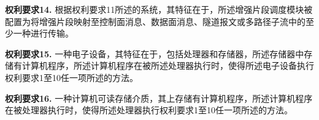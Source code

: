 \documentclass[12pt,a4paper]{article}
\begin{document}
\vspace{0.5cm}

\textbf{权利要求14.} 根据权利要求11所述的系统，其特征在于，所述增强片段调度模块被配置为将增强片段映射至控制面消息、数据面消息、隧道报文或多路径子流中的至少一种进行传输。

\vspace{0.5cm}

\textbf{权利要求15.} 一种电子设备，其特征在于，包括处理器和存储器，所述存储器中存储有计算机程序，所述计算机程序在被所述处理器执行时，使得所述电子设备执行权利要求1至10任一项所述的方法。

\vspace{0.5cm}

\textbf{权利要求16.} 一种计算机可读存储介质，其上存储有计算机程序，所述计算机程序在被处理器执行时，使得所述处理器执行权利要求1至10任一项所述的方法。
\end{document}
